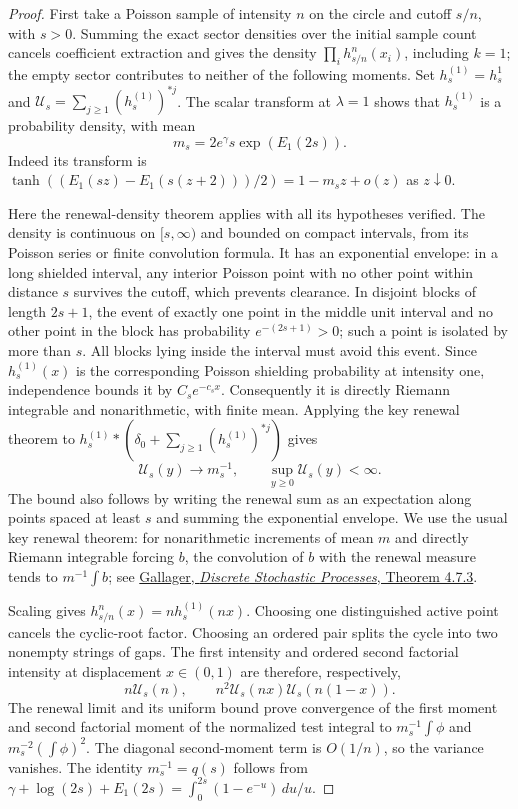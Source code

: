 \documentclass[11pt,letterpaper]{article}
\begin{document}
\begin{proof}
First take a Poisson sample of intensity $n$ on the circle and cutoff
$s/n$, with $s>0$. Summing the exact sector densities over the initial
sample count cancels coefficient extraction and gives the density
$\prod_i h_{s/n}^{n}(x_i)$, including $k=1$; the empty sector contributes
to neither of the following moments.
Set $h_s^{(1)}=h_s^1$ and
$\mathcal U_s=\sum_{j\ge1}(h_s^{(1)})^{*j}$.
The scalar transform at $\lambda=1$ shows that $h_s^{(1)}$ is a probability
density, with mean
\begin{equation}\label{eq:finite-intensity-mean}
 m_s=2e^\gamma s\exp(E_1(2s)).
\end{equation}
Indeed its transform is
$\tanh((E_1(sz)-E_1(s(z+2)))/2)=1-m_sz+o(z)$ as $z\downarrow0$.

Here the renewal-density theorem applies with all its hypotheses
verified. The density is continuous on $[s,\infty)$ and bounded on
compact intervals, from its Poisson series or finite convolution formula.
It has an exponential envelope: in a long shielded interval, any interior
Poisson point with no other point within distance $s$ survives the cutoff,
which prevents clearance. In disjoint blocks of length $2s+1$, the event
of exactly one point in the middle unit interval and no other point in
the block has probability $e^{-(2s+1)}>0$; such a point is isolated by
more than $s$. All blocks lying inside the interval must avoid this event.
Since $h_s^{(1)}(x)$ is the corresponding Poisson shielding probability
at intensity one, independence bounds it by $C_s e^{-c_s x}$.
Consequently it is directly Riemann integrable and nonarithmetic, with
finite mean. Applying the key renewal theorem to
$h_s^{(1)}*(\delta_0+\sum_{j\ge1}(h_s^{(1)})^{*j})$ gives
\[
 \mathcal U_s(y)\longrightarrow m_s^{-1},\qquad
 \sup_{y\ge0}\mathcal U_s(y)<\infty.
\]
The bound also follows by writing the renewal sum as an expectation
along points spaced at least $s$ and summing the exponential envelope.
We use the usual key renewal theorem: for nonarithmetic increments of
mean $m$ and directly Riemann integrable forcing $b$, the convolution of
$b$ with the renewal measure tends to $m^{-1}\int b$; see
\href{https://ocw.mit.edu/courses/6-262-discrete-stochastic-processes-spring-2011/931ffa0940899c27f34b71ad64fd2bb0_MIT6_262S11_chap04.pdf}{Gallager, \emph{Discrete Stochastic Processes}, Theorem 4.7.3}.

Scaling gives $h_{s/n}^n(x)=n h_s^{(1)}(nx)$.
Choosing one distinguished active point cancels the cyclic-root factor.
Choosing an ordered pair splits the cycle into two nonempty strings of
gaps. The first intensity and ordered second factorial intensity at
displacement $x\in(0,1)$ are therefore, respectively,
\[
 n\mathcal U_s(n),\qquad
 n^2\mathcal U_s(nx)\mathcal U_s(n(1-x)).
\]
The renewal limit and its uniform bound prove convergence of the first
moment and second factorial moment of the normalized test integral to
$m_s^{-1}\int\phi$ and $m_s^{-2}(\int\phi)^2$.
The diagonal second-moment term is $O(1/n)$, so the variance vanishes.
The identity $m_s^{-1}=q(s)$ follows from
$\gamma+\log(2s)+E_1(2s)=\int_0^{2s}(1-e^{-u})\,du/u$.


\end{proof}
\end{document}
